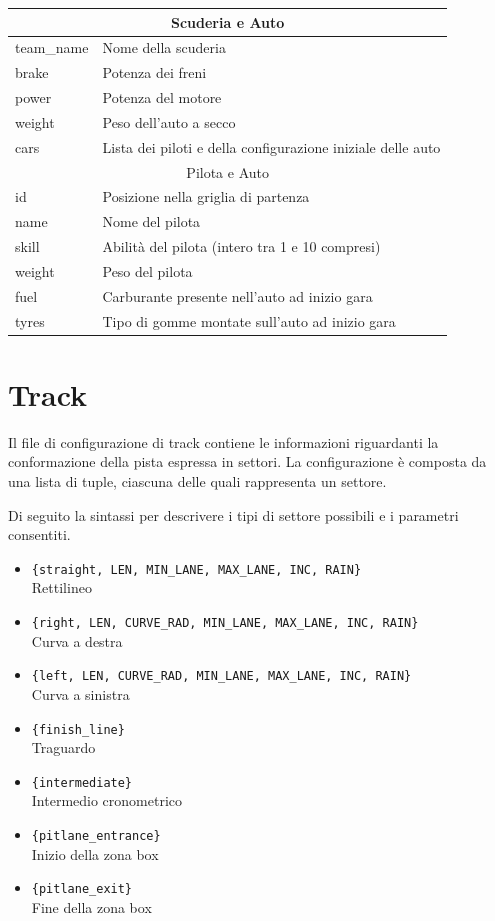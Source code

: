 \documentclass[11pt,a4paper]{report}
\begin{document}
\begin{center}
\begin{tabular}{|p{}|p{}|}
\hline
\multicolumn{2}{|c|}{Scuderia e Auto}\\
\hline
team\_name & Nome della scuderia\\
brake & Potenza dei freni\\
power & Potenza del motore\\
weight & Peso dell'auto a secco\\
cars & Lista dei piloti e della configurazione iniziale delle auto\\
\hline
\multicolumn{2}{|c|}{Pilota e Auto}\\
\hline
id & Posizione nella griglia di partenza\\
name & Nome del pilota\\
skill & Abilità del pilota (intero tra 1 e 10 compresi)\\
weight & Peso del pilota\\
fuel & Carburante presente nell'auto ad inizio gara\\
tyres & Tipo di gomme montate sull'auto ad inizio gara\\
\hline
\end{tabular}
\end{center}

\section*{Track}
Il file di configurazione di track contiene le informazioni riguardanti la conformazione della pista espressa in settori. La configurazione è composta da una lista di tuple, ciascuna delle quali rappresenta un settore.

Di seguito la sintassi per descrivere i tipi di settore possibili e i parametri consentiti.

\begin{itemize}
\item \texttt{\{straight, LEN, MIN\_LANE, MAX\_LANE, INC, RAIN\}}\\ Rettilineo
\item \texttt{\{right, LEN, CURVE\_RAD, MIN\_LANE, MAX\_LANE, INC, RAIN\}}\\ Curva a destra
\item \texttt{\{left, LEN, CURVE\_RAD, MIN\_LANE, MAX\_LANE, INC, RAIN\}}\\ Curva a sinistra
\item \texttt{\{finish\_line\}}\\ Traguardo
\item \texttt{\{intermediate\}}\\ Intermedio cronometrico
\item \texttt{\{pitlane\_entrance\}}\\ Inizio della zona box
\item \texttt{\{pitlane\_exit\}}\\ Fine della zona box
\end{itemize}
\end{document}
